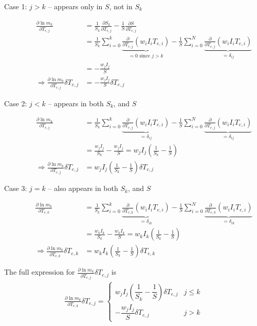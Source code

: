 \documentclass[11pt,twoside]{article}
\begin{document}
\begin{description}
    \item[Case 1: $j > k$ -- appears only in $S$, not in $S_k$]
    \begin{align*}
        \frac{\partial \ln m_k}{\partial T_{e,j}} &= 
        \frac{1}{S_k}\frac{\partial S_k}{\partial T_{e,j}} - \frac{1}{S}\frac{\partial S}{\partial T_{e,j}} \\
        &=
        \frac{1}{S_k}\sum_{i=0}^k \underbrace{\frac{\partial }{\partial T_{e,j}} \left(w_i I_i T_{e,i}\right)}_{=0 \text{ since } j > k} - \frac{1}{S} \sum_{i=0}^N\underbrace{\frac{\partial }{\partial T_{e,j}} \left(w_i I_i T_{e,i}\right)}_{=\delta_{ij}} \\
        &= -\frac{w_j I_j }{S} \\
        \Rightarrow \frac{\partial \ln m_k}{\partial T_{e,j}}\delta T_{e,j} &= -\frac{w_j I_j}{S} \delta T_{e,j}
    \end{align*}
    \item[Case 2: $j < k$ -- appears in both $S_k$, and $S$]
    \begin{align*}
        \frac{\partial \ln m_k}{\partial T_{e,j}} &= \frac{1}{S_k}\sum_{i=0}^k \underbrace{\frac{\partial }{\partial T_{e,j}} \left(w_i I_i T_{e,i}\right)}_{=\delta_{ij}} - \frac{1}{S}\sum_{i=0}^N\underbrace{\frac{\partial }{\partial T_{e,j}} \left(w_i I_i T_{e,i}\right)}_{=\delta_{ij}} \\
        &=
        \frac{w_j I_j}{S_k} - \frac{w_j I_j }{S} = w_j I_j  \left( \frac{1}{S_k}  - \frac{1}{S}\right) \\
        \Rightarrow \frac{\partial \ln m_k}{\partial T_{e,j}} \delta T_{e,j} &=
        w_j I_j \left( \frac{1}{S_k}  - \frac{1}{S}\right) \delta T_{e,j}
    \end{align*}
    \item[Case 3: $j=k$ -- also  appears in both $S_k$, and $S$] 
    \begin{align*}
        \frac{\partial \ln m_k}{\partial T_{e,k}} &= \frac{1}{S_k}\sum_{i=0}^k \underbrace{\frac{\partial }{\partial T_{e,k}} \left(w_i I_i T_{e,i}\right)}_{=\delta_{ik}} - \frac{1}{S}\sum_{i=0}^N\underbrace{\frac{\partial }{\partial T_{e,k}} \left(w_i I_i T_{e,i}\right)}_{=\delta_{ik}} \\
        &=
        \frac{w_k I_k}{S_k} - \frac{w_k I_k }{S}
        =
        w_k I_k \left( \frac{1}{S_k}  - \frac{1}{S}\right) \\
        \Rightarrow \frac{\partial \ln m_k}{\partial T_{e,k}} \delta T_{e,k} 
        &=
        w_k I_k \left( \frac{1}{S_k}  - \frac{1}{S}\right) \delta T_{e,k} 
    \end{align*}
\end{description}
The full expression for $\frac{\partial \ln m_k}{\partial T_{e,j}}\delta T_{e,j}$ is
\begin{align}
    \frac{\partial \ln m_k}{\partial T_{e,k}} \delta T_{e,j} =
    \begin{cases}
        w_j I_j \left( \dfrac{1}{S_k} - \dfrac{1}{S}\right)\delta T_{e,j} & j \leq k \\[1.5em]
        -\dfrac{w_jI_j}{S}\delta T_{e,j} & j > k
    \end{cases}
\end{align}
\end{document}
